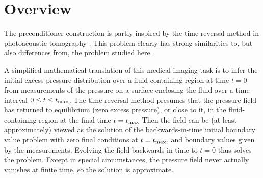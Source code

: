 \documentclass[georeport,12pt]{geophysics}
\newcommand{\bff}{\mathbf{f}}
\newcommand{\bu}{\mathbf{u}}
\begin{document}

\section{Overview}

The preconditioner construction is partly inspired by the time
reversal method in photoacoustic tomography
\cite[]{StefanovUhlmannIP:09,Hristova:09}. This problem
clearly has strong similarities to, but also differences from, the
problem studied here.

A simplified mathematical
translation of this medical imaging task is to infer the initial
excess pressure distribution over a fluid-containing region at time
$t=0$ from measurements of the pressure on a surface enclosing the
fluid over a time interval $0 \le t \le t_{\rm max}$. The time reversal method presumes that the
pressure field has returned to equilibrium (zero excess pressure), or
close to it, in the fluid-containing region at the
final time $t=t_{\rm max}$ Then the field can be (at least
approximately) viewed as the solution of the backwards-in-time initial boundary value
problem with zero final conditions at $t=t_{\rm max}$, and boundary
values given by the measurements. Evolving the field backwards in time
to $t=0$ thus solves the problem. Except in special
circumstances, the pressure field never actually vanishes at finite
time, so the solution is approximate.
\end{document}
